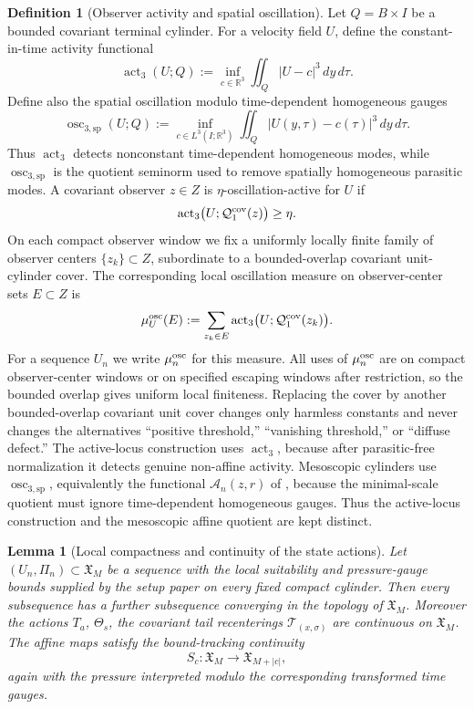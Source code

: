 \documentclass[11pt]{amsart}
\numberwithin{equation}{section}
\theoremstyle{plain}
\newtheorem{lemma}[theorem]{Lemma}
\theoremstyle{definition}
\newtheorem{definition}[theorem]{Definition}
\theoremstyle{remark}
\newcommand{\oscsp}{\operatorname{osc}_{3,\mathrm{sp}}}
\newcommand{\actthree}{\operatorname{act}_3}
\begin{document}
\begin{definition}[Observer activity and spatial oscillation]
\label{def:observer-oscillation}
Let \(Q=B\times I\) be a bounded covariant terminal cylinder.  For a velocity
field \(U\), define the constant-in-time activity functional
\[
   \actthree(U;Q)
   :=
   \inf_{c\in\mathbb R^3}\iint_Q |U-c|^3\,dy\,d\tau .
\]
Define also the spatial oscillation modulo time-dependent homogeneous gauges
\[
   \oscsp(U;Q)
   :=
   \inf_{c\in L^3(I;\mathbb R^3)}
      \iint_Q |U(y,\tau)-c(\tau)|^3\,dy\,d\tau .
\]
Thus \(\actthree\) detects nonconstant time-dependent homogeneous modes, while
\(\oscsp\) is the quotient seminorm used to remove spatially homogeneous
parasitic modes.
A covariant observer \(z\in Z\) is \(\eta\)-oscillation-active for \(U\) if
\[
   \actthree\bigl(U;\mathcal Q_1^{\rm cov}(z)\bigr)\ge\eta .
\]
On each compact observer window we fix a uniformly locally finite family of
observer centers \(\{z_k\}\subset Z\), subordinate to a bounded-overlap
covariant unit-cylinder cover.  The corresponding local oscillation measure on
observer-center sets \(E\subset Z\) is
\[
   \mu_U^{\rm osc}(E)
   :=
   \sum_{z_k\in E}
      \actthree\bigl(U;\mathcal Q_1^{\rm cov}(z_k)\bigr) .
\]
For a sequence \(U_n\) we write \(\mu_n^{\rm osc}\) for this measure.  All
uses of \(\mu_n^{\rm osc}\) are on compact observer-center windows or on
specified escaping windows after restriction, so the bounded overlap gives uniform local
finiteness.  Replacing the cover by another bounded-overlap covariant unit
cover changes only harmless constants and never changes the alternatives
``positive threshold,'' ``vanishing threshold,'' or ``diffuse defect.''  The
active-locus construction uses \(\actthree\), because after parasitic-free
normalization it detects genuine non-affine activity.  Mesoscopic cylinders use
\(\oscsp\), equivalently the functional \(\mathcal A_n(z,r)\) of
, because the minimal-scale quotient
must ignore time-dependent homogeneous gauges.  Thus the active-locus
construction and the mesoscopic affine quotient are kept distinct.
\end{definition}

\begin{lemma}[Local compactness and continuity of the state actions]
\label{lem:state-space-local-compactness}
Let \((U_n,\Pi_n)\subset\mathfrak X_M\) be a sequence with the local suitability
and pressure-gauge bounds supplied by the setup paper on every fixed compact
cylinder.
Then every subsequence has a further subsequence converging in the topology of
\(\mathfrak X_M\).  Moreover the actions \(T_a\), \(\Theta_s\), the covariant
tail recenterings \(\mathscr T_{(x,\sigma)}\) are continuous on
\(\mathfrak X_M\).  The affine maps satisfy the bound-tracking continuity
\[
   S_c:\mathfrak X_M\longrightarrow \mathfrak X_{M+|c|},
\]
again with the pressure interpreted modulo the corresponding transformed time
gauges.
\end{lemma}
\end{document}
